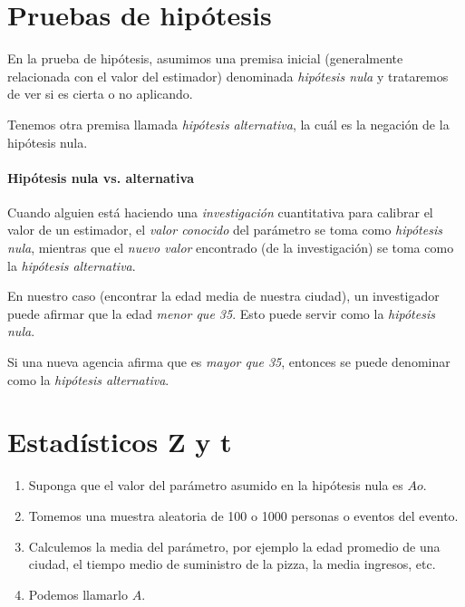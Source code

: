 \section{Pruebas de hipótesis}
% 
% 


En la prueba de hipótesis, asumimos una
premisa inicial (generalmente relacionada con el valor del estimador) denominada \emph{hipótesis nula}  y
trataremos de ver si es cierta o no aplicando.



Tenemos otra premisa llamada \emph{hipótesis alternativa}, la cuál es la negación de la hipótesis nula.


\paragraph{Hipótesis nula vs. alternativa}
%
%
% 
%
% 
 Cuando alguien está haciendo una \emph{investigación} cuantitativa para calibrar el valor de un estimador,  el \emph{valor conocido} del parámetro se toma como \emph{hipótesis nula},  mientras que el \emph{nuevo valor} encontrado (de la investigación) se toma como la \emph{hipótesis alternativa}.
 


 En nuestro caso (encontrar la edad media de nuestra ciudad), un investigador puede afirmar que la edad
\emph{menor que 35}. Esto puede servir como la \emph{hipótesis nula}.


Si una nueva agencia afirma
que es \emph{mayor que 35}, entonces se puede denominar como la \emph{hipótesis alternativa}.


\section{Estadísticos Z y t}

\begin{enumerate}
 \item Suponga que el valor del parámetro asumido en la hipótesis nula es $Ao$. 
 \item Tomemos
una muestra aleatoria de 100 o 1000 personas o eventos del evento. 
\item Calculemos
la media del parámetro, por ejemplo la edad promedio de una ciudad, el tiempo medio de suministro de la pizza, la media
ingresos, etc. 
\item Podemos llamarlo $A$.
\end{enumerate}




